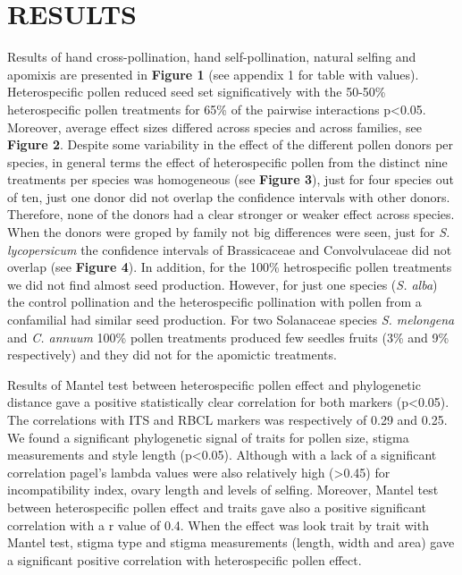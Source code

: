 \documentclass[11pt,a4paper]{article}
\begin{document}
\section{RESULTS}\label{results}

Results of hand cross-pollination, hand self-pollination, natural
selfing and apomixis are presented in \textbf{Figure 1} (see appendix 1
for table with values). Heterospecific pollen reduced seed set
significatively with the 50-50\% heterospecific pollen treatments for
65\% of the pairwise interactions p\textless{}0.05. Moreover, average
effect sizes differed across species and across families, see
\textbf{Figure 2}. Despite some variability in the effect of the
different pollen donors per species, in general terms the effect of
heterospecific pollen from the distinct nine treatments per species was
homogeneous (see \textbf{Figure 3}), just for four species out of ten,
just one donor did not overlap the confidence intervals with other
donors. Therefore, none of the donors had a clear stronger or weaker
effect across species. When the donors were groped by family not big
differences were seen, just for \emph{S. lycopersicum} the confidence
intervals of Brassicaceae and Convolvulaceae did not overlap (see
\textbf{Figure 4}). In addition, for the 100\% hetrospecific pollen
treatments we did not find almost seed production. However, for just one
species (\emph{S. alba}) the control pollination and the heterospecific
pollination with pollen from a confamilial had similar seed production.
For two Solanaceae species \emph{S. melongena} and \emph{C. annuum}
100\% pollen treatments produced few seedles fruits (3\% and 9\%
respectively) and they did not for the apomictic treatments.

Results of Mantel test between heterospecific pollen effect and
phylogenetic distance gave a positive statistically clear correlation
for both markers (p\textless{}0.05). The correlations with ITS and RBCL
markers was respectively of 0.29 and 0.25. We found a significant
phylogenetic signal of traits for pollen size, stigma measurements and
style length (p\textless{}0.05). Although with a lack of a significant
correlation pagel's lambda values were also relatively high
(\textgreater{}0.45) for incompatibility index, ovary length and levels
of selfing. Moreover, Mantel test between heterospecific pollen effect
and traits gave also a positive significant correlation with a r value
of 0.4. When the effect was look trait by trait with Mantel test, stigma
type and stigma measurements (length, width and area) gave a significant
positive correlation with heterospecific pollen effect.
\end{document}
